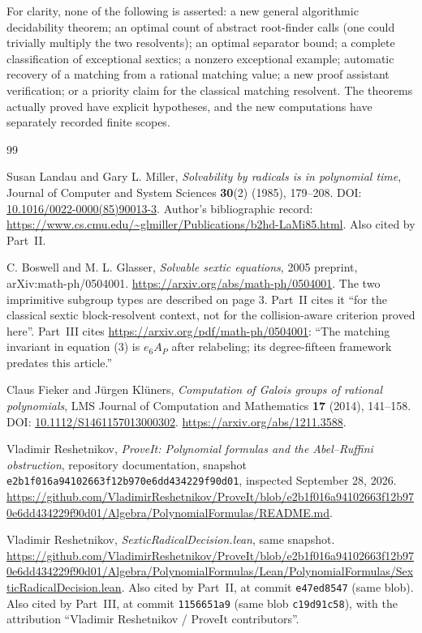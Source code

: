 \documentclass[11pt,letterpaper]{article}
\numberwithin{equation}{section}
\theoremstyle{definition}
\theoremstyle{remark}
\newcommand{\src}[1]{\texttt{\nolinkurl{#1}}}
\newcommand{\snapshot}{\texttt{e2b1f016a94102663f12b970e6dd434229f90d01}}
\begin{document}
For clarity, none of the following is asserted: a new general algorithmic
decidability theorem; an optimal count of abstract root-finder calls
(one could trivially multiply the two resolvents); an optimal separator
bound; a complete classification of exceptional sextics; a nonzero
exceptional example; automatic recovery of a matching from a rational
matching value; a new proof assistant verification; or a priority claim
for the classical matching resolvent. The theorems actually proved have
explicit hypotheses, and the new computations have separately recorded
finite scopes.


\begin{thebibliography}{99}

Susan Landau and Gary L. Miller,
\emph{Solvability by radicals is in polynomial time},
Journal of Computer and System Sciences \textbf{30}(2) (1985), 179--208.
DOI: \href{https://doi.org/10.1016/0022-0000(85)90013-3}{10.1016/0022-0000(85)90013-3}.
Author's bibliographic record:
\url{https://www.cs.cmu.edu/~glmiller/Publications/b2hd-LaMi85.html}.
Also cited by Part~II.

C. Boswell and M. L. Glasser,
\emph{Solvable sextic equations}, 2005 preprint,
arXiv:math-ph/0504001.
\url{https://arxiv.org/abs/math-ph/0504001}.
The two imprimitive subgroup types are described on page 3.
Part~II cites it ``for the classical sextic block-resolvent context, not for
the collision-aware criterion proved here''.
Part~III cites \url{https://arxiv.org/pdf/math-ph/0504001}: ``The matching
invariant in equation (3) is $e_6A_P$ after relabeling; its degree-fifteen
framework predates this article.''

Claus Fieker and J\"urgen Kl\"uners,
\emph{Computation of Galois groups of rational polynomials},
LMS Journal of Computation and Mathematics \textbf{17} (2014), 141--158.
DOI: \href{https://doi.org/10.1112/S1461157013000302}{10.1112/S1461157013000302}.
\url{https://arxiv.org/abs/1211.3588}.

Vladimir Reshetnikov, \emph{ProveIt: Polynomial formulas and the
Abel--Ruffini obstruction}, repository documentation, snapshot
\snapshot, inspected September 28, 2026.
\url{https://github.com/VladimirReshetnikov/ProveIt/blob/e2b1f016a94102663f12b970e6dd434229f90d01/Algebra/PolynomialFormulas/README.md}.

Vladimir Reshetnikov, \emph{SexticRadicalDecision.lean}, same snapshot.
\url{https://github.com/VladimirReshetnikov/ProveIt/blob/e2b1f016a94102663f12b970e6dd434229f90d01/Algebra/PolynomialFormulas/Lean/PolynomialFormulas/SexticRadicalDecision.lean}.
Also cited by Part~II, at commit \src{e47ed8547} (same blob).
Also cited by Part~III, at commit \src{1156651a9} (same blob
\src{c19d91c58}), with the attribution ``Vladimir Reshetnikov / ProveIt
contributors''.


\end{thebibliography}
\end{document}
